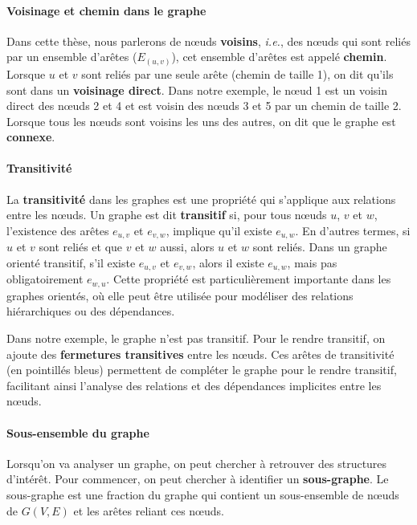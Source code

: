 \paragraph{Voisinage et chemin dans le graphe}

Dans cette thèse, nous parlerons de n\oe uds \textbf{voisins}, \textit{i.e.}, des n\oe uds qui sont reliés par un ensemble d'arêtes ($E_{(u,v)}$), cet ensemble d'arêtes est appelé \textbf{chemin}. Lorsque $u$ et $v$ sont reliés par une seule arête (chemin de taille 1), on dit qu'ils sont dans un \textbf{voisinage direct}. Dans notre exemple, le n\oe ud 1 est un voisin direct des n\oe uds 2 et 4 et est voisin des n\oe uds 3 et 5 par un chemin de taille 2. Lorsque tous les n\oe uds sont voisins les uns des autres, on dit que le graphe est \textbf{connexe}.

\newpage
\paragraph{Transitivité}

La \textbf{transitivité} dans les graphes est une propriété qui s'applique aux relations entre les n\oe uds. Un graphe est dit \textbf{transitif} si, pour tous n\oe uds $u$, $v$ et $w$, l'existence des arêtes $e_{u,v}$ et $e_{v, w}$, implique qu'il existe $e_{u,w}$. En d'autres termes, si $u$ et $v$ sont reliés et que $v$ et $w$ aussi, alors $u$ et $w$ sont reliés. Dans un graphe orienté transitif, s'il existe $e_{u,v}$ et $e_{v, w}$, alors il existe $e_{u, w}$, mais pas obligatoirement $e_{w, u}$. Cette propriété est particulièrement importante dans les graphes orientés, où elle peut être utilisée pour modéliser des relations hiérarchiques ou des dépendances. 

Dans notre exemple, le graphe n'est pas transitif. Pour le rendre transitif, on ajoute des \textbf{fermetures transitives} entre les n\oe uds. Ces arêtes de transitivité (en pointillés bleus) permettent de compléter le graphe pour le rendre transitif, facilitant ainsi l'analyse des relations et des dépendances implicites entre les n\oe uds.

\paragraph{Sous-ensemble du graphe}

Lorsqu'on va analyser un graphe, on peut chercher à retrouver des structures d'intérêt. Pour commencer, on peut chercher à identifier un \textbf{sous-graphe}. Le sous-graphe est une fraction du graphe qui contient un sous-ensemble de n\oe uds de $G(V, E)$ et les arêtes reliant ces n\oe uds. 

